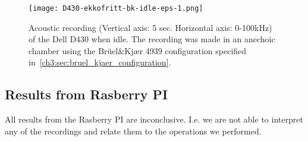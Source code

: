 
\begin{figure}[ht]
    \centering
    \texttt{[image: D430-ekkofritt-bk-idle-eps-1.png]}
    \caption{Acoustic recording (Vertical axis: 5 sec. Horizontal axis: 0-100kHz) of the Dell D430 when idle. The recording was made in an anechoic chamber using the Brüel\&Kjær 4939 configuration specified in~\autoref{ch3:sec:bruel_kjaer_configuration}. }
    \label{fig:D430-ekkofritt-bk-idle-eps-1}
\end{figure}

\subsection{Results from Rasberry PI}\label{chp5:subsec:rb_bk_results}
All results from the Rasberry PI are inconclusive. 
I.e. we are not able to interpret any of the recordings and relate them to the operations we performed.